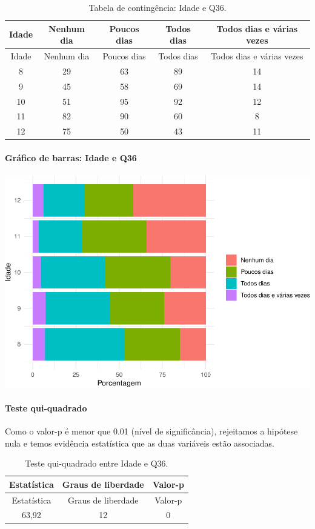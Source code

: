 \documentclass[]{article}
\let\oldparagraph\paragraph
\renewcommand{\paragraph}[1]{\oldparagraph{#1}\mbox{}}
\begin{document}
\begin{longtable}[]{@{}ccccc@{}}
\caption{\label{tab:unnamed-chunk-1331}Tabela de contingência: Idade e Q36.}\tabularnewline
\toprule
Idade & Nenhum dia & Poucos dias & Todos dias & Todos dias e várias vezes\tabularnewline
\midrule
\endfirsthead
\toprule
Idade & Nenhum dia & Poucos dias & Todos dias & Todos dias e várias vezes\tabularnewline
\midrule
\endhead
8 & 29 & 63 & 89 & 14\tabularnewline
9 & 45 & 58 & 69 & 14\tabularnewline
10 & 51 & 95 & 92 & 12\tabularnewline
11 & 82 & 90 & 60 & 8\tabularnewline
12 & 75 & 50 & 43 & 11\tabularnewline
\bottomrule
\end{longtable}

\hypertarget{gruxe1fico-de-barras-idade-e-q36}{%
\paragraph{Gráfico de barras: Idade e Q36}\label{gruxe1fico-de-barras-idade-e-q36}}

\begin{center}\includegraphics[width=0.75\linewidth]{relatorio_covid19_files/figure-latex/unnamed-chunk-1332-1} \end{center}

\hypertarget{teste-qui-quadrado-114}{%
\paragraph{Teste qui-quadrado}\label{teste-qui-quadrado-114}}

Como o valor-p é menor que 0.01 (nível de significância), rejeitamos a hipótese nula e temos evidência estatística que as duas variáveis estão associadas.

\begin{longtable}[]{@{}ccc@{}}
\caption{\label{tab:unnamed-chunk-1334}Teste qui-quadrado entre Idade e Q36.}\tabularnewline
\toprule
Estatística & Graus de liberdade & Valor-p\tabularnewline
\midrule
\endfirsthead
\toprule
Estatística & Graus de liberdade & Valor-p\tabularnewline
\midrule
\endhead
63,92 & 12 & 0\tabularnewline
\bottomrule
\end{longtable}
\end{document}
